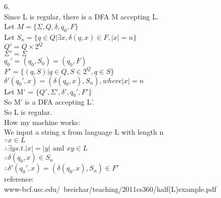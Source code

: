 \documentclass[a4paper]{article}
\begin{document}
6. \\
Since L is regular, there is a DFA M accepting L.\\
Let $M = \{\Sigma, Q, \delta, q_0, F \}$\\
Let $S_n = \{q \in Q | \exists x, \delta(q,x) \in F, |x|=n\}$\\
$Q'=Q \times 2^Q$\\
$\Sigma'=\Sigma$\\
$q_0'=(q_0,S_0)=(q_0,F)$\\
$F'=\{(q,S)|q \in Q, S \in 2^Q, q \in S\}$\\
$\delta' (q_0',x)=(\delta(q_0,x),S_n), where |x|=n$\\
Let M' = $\{Q', \Sigma', \delta', q_0', F'\}$\\
So M' is a DFA accepting L'.\\
So L is regular.\\
How my machine works:\\
We input a string x from language L with length n\\
$\because x \in L$\\
$\therefore \exists y s.t. |x|=|y|$ and $xy \in L$\\
$\therefore \delta(q_0,x) \in S_n$\\
$\therefore \delta' (q_0',x)=(\delta(q_0,x),S_n) \in F'$\\
reference:\\
www-bcf.usc.edu/~breichar/teaching/2011cs360/half(L)example.pdf
\end{document}
